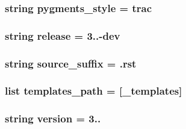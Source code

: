 \subsubsection[{pygments\+\_\+style}]{\setlength{\rightskip}{0pt plus 5cm}string pygments\+\_\+style = \textquotesingle{}trac\textquotesingle{}}\label{namespaceconf_a55caf0e3a3760b53be9bc254d13dfbf2}
\hypertarget{namespaceconf_a82643d1a47993da158506ac788f70fc4}{}
\subsubsection[{release}]{\setlength{\rightskip}{0pt plus 5cm}string release = \textquotesingle{}3..-\/dev\textquotesingle{}}\label{namespaceconf_a82643d1a47993da158506ac788f70fc4}
\hypertarget{namespaceconf_ab5a6e10918566e45dfbea4f058e904f9}{}
\subsubsection[{source\+\_\+suffix}]{\setlength{\rightskip}{0pt plus 5cm}string source\+\_\+suffix = \textquotesingle{}.rst\textquotesingle{}}\label{namespaceconf_ab5a6e10918566e45dfbea4f058e904f9}
\hypertarget{namespaceconf_af5fc85fd05db5329f792629094fdd12c}{}
\subsubsection[{templates\+\_\+path}]{\setlength{\rightskip}{0pt plus 5cm}list templates\+\_\+path = \mbox{[}\textquotesingle{}\+\_\+templates\textquotesingle{}\mbox{]}}\label{namespaceconf_af5fc85fd05db5329f792629094fdd12c}
\hypertarget{namespaceconf_af9c8593b58583463efe6932e24c9d6e6}{}
\subsubsection[{version}]{\setlength{\rightskip}{0pt plus 5cm}string version = \textquotesingle{}3..\textquotesingle{}}\label{namespaceconf_af9c8593b58583463efe6932e24c9d6e6}
